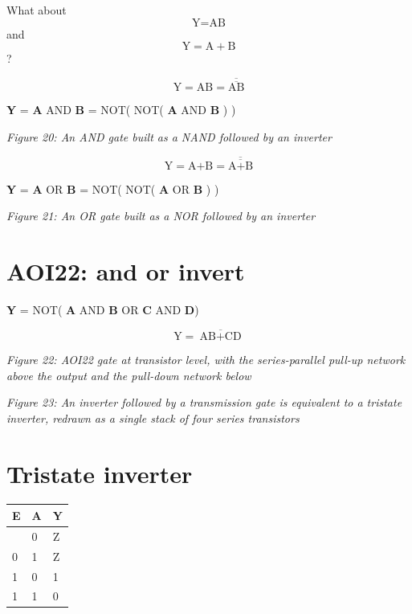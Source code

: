 What about \[\text{Y} = \text{AB}\] and
\[\text{Y} = \text{A} + \text{B}\]?

\[\text{Y} = \text{AB} = \overline{\overline{\text{AB}}}\]

\textbf{Y} = \textbf{A} AND \textbf{B} = NOT( NOT( \textbf{A} AND
\textbf{B} ) )


{
\centering
{}
}

\emph{Figure 20: An AND gate built as a NAND followed by an inverter}

\[\text{Y} = \text{A+B} = \overline{\overline{\text{A+B}}}\]

\textbf{Y} = \textbf{A} OR \textbf{B} = NOT( NOT( \textbf{A} OR
\textbf{B} ) )


{
\centering
{}
}

\emph{Figure 21: An OR gate built as a NOR followed by an inverter}

\section{AOI22: and or invert}\label{aoi22-and-or-invert}

\textbf{Y} = NOT( \textbf{A} AND \textbf{B} OR \textbf{C} AND
\textbf{D})

\[\text{Y} =  \overline{\text{AB} + \text{CD}}\]


{
\centering
{}
}

\emph{Figure 22: AOI22 gate at transistor level, with the
series-parallel pull-up network above the output and the pull-down
network below}


{
\centering
{}
}

\emph{Figure 23: An inverter followed by a transmission gate is
equivalent to a tristate inverter, redrawn as a single stack of four
series transistors}

\section{Tristate inverter}\label{tristate-inverter}

\begin{longtable}[]{@{}lll@{}}
\toprule\noalign{}
E & A & Y \\
\midrule\noalign{}
\endhead
\bottomrule\noalign{}
\endlastfoot
0 & 0 & Z \\
0 & 1 & Z \\
1 & 0 & 1 \\
1 & 1 & 0 \\
\end{longtable}


